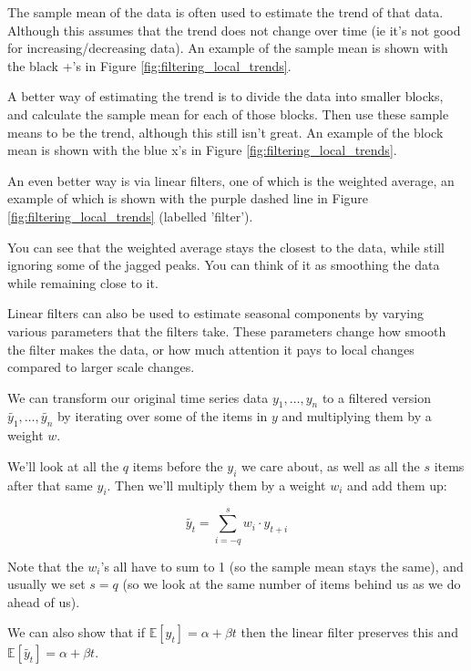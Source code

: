 \documentclass[12pt]{article}
\begin{document}
        The sample mean of the data is often used to estimate the trend of that data. Although this assumes that the trend does not change over time (ie it's not good for increasing/decreasing data).
        An example of the sample mean is shown with the black +'s in Figure \ref{fig:filtering_local_trends}.

        A better way of estimating the trend is to divide the data into smaller blocks, and calculate the sample mean for each of those blocks. Then use these sample means to be the trend, although this still isn't great.
        An example of the block mean is shown with the blue x's in Figure \ref{fig:filtering_local_trends}.

        An even better way is via linear filters, one of which is the weighted average, an example of which is shown with the purple dashed line in Figure \ref{fig:filtering_local_trends} (labelled 'filter').

        You can see that the weighted average stays the closest to the data, while still 
        ignoring some of the jagged peaks. You can think of it as smoothing the data while
        remaining close to it.

        Linear filters can also be used to estimate seasonal components by varying various parameters that the filters take. These parameters change how smooth the filter makes the data, or how much attention it pays to local changes compared to larger scale changes.

        We can transform our original time series data $y_1, \dots, y_n$ to a filtered
        version $\tilde{y_1}, \dots, \tilde{y_n}$ by iterating over some of the items
        in $y$ and multiplying them by a weight $w$. 

        We'll look at all the $q$ items before the $y_i$ we care about, as well as all the $s$
        items after that same $y_i$. Then we'll multiply them by a weight $w_i$ and add them
        up:

        \begin{equation*}
            \tilde{y_t} = \sum_{i = -q}^{s} w_i \cdot y_{t+i}
        \end{equation*}

        Note that the $w_i$'s all have to sum to 1 (so the sample mean stays the same), 
        and usually we set $s = q$ (so we look at the same number of items behind us 
        as we do ahead of us).

        We can also show that if $\mathbb{E}[y_t] = \alpha + \beta t$ then the linear filter
        preserves this and $\mathbb{E}[\tilde{y_t}] = \alpha + \beta t$.
\end{document}
